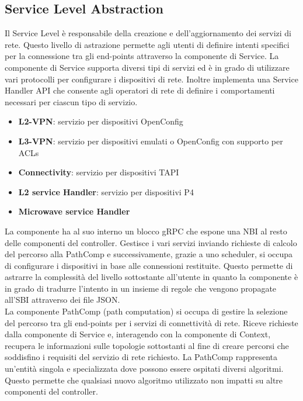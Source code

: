 \subsection{Service Level Abstraction}
Il Service Level è responsabile della creazione e dell'aggiornamento dei servizi di rete.
Questo livello di astrazione permette agli utenti di definire intenti specifici per la connessione tra gli end-points attraverso la componente di Service.
La componente di Service supporta diversi tipi di servizi ed è in grado di utilizzare vari protocolli per configurare i dispositivi di rete.
Inoltre implementa una Service Handler API che consente agli operatori di rete di definire i comportamenti necessari per ciascun tipo di servizio.
\begin{itemize}
    \item \textbf{L2-VPN}: servizio per dispositivi OpenConfig
    \item \textbf{L3-VPN}: servizio per dispositivi emulati o OpenConfig con supporto per ACLs
    \item \textbf{Connectivity}: servizio per dispositivi TAPI
    \item \textbf{L2 service Handler}: servizio per dispositivi P4
    \item \textbf{Microwave service Handler}
\end{itemize}
La componente ha al suo interno un blocco gRPC che espone una NBI al resto delle componenti del controller. 
Gestisce i vari servizi inviando richieste di calcolo del percorso alla PathComp e successivamente, grazie a uno scheduler, si occupa di
configurare i dispositivi in base alle connessioni restituite. Questo permette di astrarre la complessità del livello sottostante all'utente
in quanto la componente è in grado di tradurre l'intento in un insieme di regole che vengono propagate all'SBI attraverso dei file JSON.
\\La componente PathComp (path computation) si occupa di gestire la selezione del percorso tra gli end-points per i servizi di connettività di rete. 
Riceve richieste dalla componente di Service e, interagendo con la componente di Context, recupera le informazioni sulle topologie sottostanti al fine di creare
percorsi che soddisfino i requisiti del servizio di rete richiesto.
La PathComp rappresenta un'entità singola e specializzata dove possono essere ospitati diversi algoritmi. Questo permette che qualsiasi nuovo algoritmo utilizzato non impatti su altre componenti del controller.
